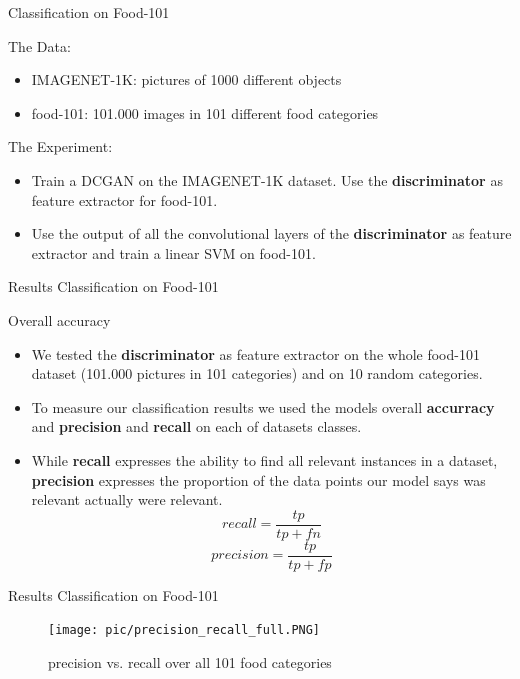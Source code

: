 \documentclass[10pt]{beamer}
\begin{document}
{
\begin{frame}{Classification on Food-101}
      \begin{block}{The Data:}
	\begin{itemize}
    \item IMAGENET-1K: pictures of 1000 different objects
    \item food-101: 101.000 images in 101 different food categories
  \end{itemize}
    \end{block}
        \begin{block}{The Experiment:}
	\begin{itemize}
	\item Train a DCGAN on the IMAGENET-1K dataset. Use the \textbf{discriminator} as feature extractor for food-101. 
	\item Use the output of all the convolutional layers of the \textbf{discriminator} as feature extractor and train a linear SVM on food-101.
  \end{itemize}
    \end{block}
\end{frame}
}
{
\begin{frame}{Results Classification on Food-101}
      \begin{block}{Overall accuracy}
	\begin{itemize}[<+- | alert@+>]
    \item We tested the \textbf{discriminator} as feature extractor on the whole food-101 dataset (101.000 pictures in 101 categories) and on 10 random categories.
    \item To measure our classification results we used the models overall \textbf{accurracy} and \textbf{precision} and \textbf{recall} on each of datasets classes. 
    \item While \textbf{recall} expresses the ability to find all relevant instances in a dataset, \textbf{precision} expresses the proportion of the data points our model says was relevant actually were relevant.
    $$ recall = \frac{tp}{tp + fn} $$
    $$ precision = \frac{tp}{tp + fp}$$
  \end{itemize}
    \end{block}
\end{frame}
}

{
\begin{frame}{Results Classification on Food-101}
\begin{figure}[htbp] 
  \centering
     \texttt{[image: pic/precision\_recall\_full.PNG]}
  \caption{precision vs. recall over all 101 food categories }
  \label{fig:Bild1}
\end{figure}
\end{frame}
}
\end{document}
